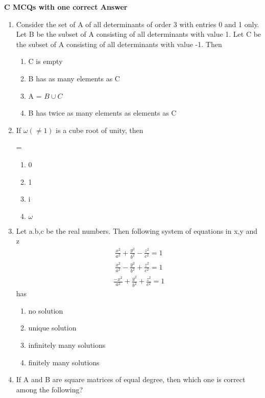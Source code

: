 \textbf {\large{C MCQs with one correct Answer}}
\begin{enumerate}
\item Consider the set of A of all determinants of order 3 with entries 0 and 1 only. Let B be the subset of A consisting of all determinants with value 1. Let C be the subset of A consisting of all determinants with value -1. Then 
\begin{enumerate}
 \item C is empty
 \item B has as many elements as C
 \item A = $B\cup C$ 
 \item B has twice as many elements as elements as C
 \end{enumerate}
 \item If $\omega(\neq1)$ is a cube root of unity, then =
 \begin{enumerate}
 \item 0
 \item 1
 \item i
 \item $\omega$
 \end{enumerate}
 \item Let a.b,c be the real numbers. Then following system of equations in x,y and z
 \begin{align} \frac{x^2}{a^2} +\frac{y^2}{b^2}-\frac{z^2}{c^2} = 1\end{align} \begin{align} \frac{x^2}{a^2}-\frac{y^2}{b^2}+\frac{z^2}{c^2} = 1\end{align}  \begin{align} \frac{-x^2}{a^2}+\frac{y^2}{b^2}+\frac{z^2}{c^2} = 1\end{align} has
 \begin{enumerate}
 \item no solution
 \item unique solution
 \item infinitely many solutions 
 \item finitely many solutions
 \end{enumerate}
\item If A and B are square matrices of equal degree, then which one is correct among the following?
\begin{enumerate}

\end{enumerate}
\end{enumerate}
